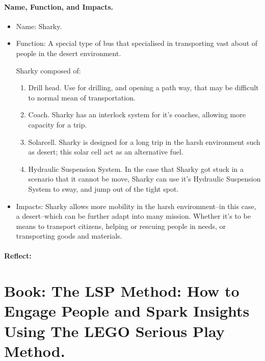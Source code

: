 \documentclass[11pt]{book}
\begin{document}
					\paragraph{Name, Function, and Impacts.}
						\begin{itemize}
							\item Name:
								\subitem Sharky.
							\item Function:
								\subitem A special type of bus that specialised in transporting vast about of people in the desert environment.
								
								Sharky composed of:
									\begin{enumerate}
										\item Drill head.
											\subitem Use for drilling, and opening a path way, that may be difficult to normal mean of transportation.
										\item Coach.
											\subitem Sharky has an interlock system for it's coaches, allowing more capacity for a trip.
										\item Solarcell.
											\subitem Sharky is designed for  a long trip in the harsh environment such as desert; this solar cell act as an alternative fuel.
										\item Hydraulic Suspension System.
											\subitem  In the case that Sharky got stuck in a scenario that it cannot be move, Sharky can use it's Hydraulic Suspension System to sway, and jump out of the tight spot.
									\end{enumerate}
							\item Impacts:
								\subitem Sharky allows more mobility in the harsh environment--in this case, a desert--which can be further adapt into many mission. Whether it's to be means to transport citizens, helping or rescuing people in needs,  or transporting goods and materials.
						\end{itemize}
						
					\paragraph{Reflect:}
						
\newpage


		\section{Book: The LSP Method: How to Engage People and Spark Insights Using The LEGO Serious Play Method.}
\end{document}
